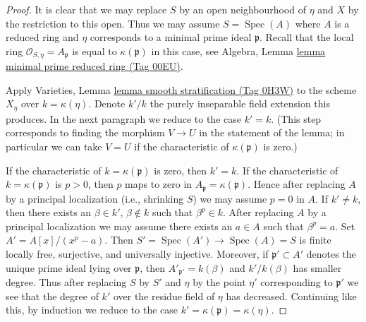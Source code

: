\documentclass{amsart}
\theoremstyle{plain}
\theoremstyle{definition}
\theoremstyle{remark}
\numberwithin{equation}{subsection}
\def\Spec{\mathop{\mathrm{Spec}}}
\begin{document}
\begin{proof}
It is clear that we may replace $S$ by an open neighbourhood of $\eta$
and $X$ by the restriction to this open.
Thus we may assume $S = \Spec(A)$ where $A$ is a reduced ring
and $\eta$ corresponds to a minimal prime ideal $\mathfrak p$.
Recall that the local ring $\mathcal{O}_{S, \eta} = A_\mathfrak p$
is equal to $\kappa(\mathfrak p)$ in this case, see
Algebra, Lemma \href{https://stacks.math.columbia.edu/tag/00EU}{lemma minimal prime reduced ring (Tag 00EU)}.

\medskip\noindent
Apply Varieties, Lemma \href{https://stacks.math.columbia.edu/tag/0H3W}{lemma smooth stratification (Tag 0H3W)}
to the scheme $X_\eta$ over $k = \kappa(\eta)$.
Denote $k'/k$ the purely inseparable field extension this produces.
In the next paragraph we reduce to the case $k' = k$.
(This step corresponds to finding the morphism $V \to U$ in
the statement of the lemma; in particular we can take $V = U$
if the characteristic of $\kappa(\mathfrak p)$ is zero.)

\medskip\noindent
If the characteristic of $k = \kappa(\mathfrak p)$ is zero, then
$k' = k$. If the characteristic of $k = \kappa(\mathfrak p)$
is $p > 0$, then $p$ maps to zero in $A_\mathfrak p = \kappa(\mathfrak p)$.
Hence after replacing $A$ by a principal localization (i.e.,
shrinking $S$) we may assume $p = 0$ in $A$. If $k' \not = k$, then
there exists an $\beta \in k'$, $\beta \not \in k$
such that $\beta^p \in k$. After replacing $A$ by a principal
localization we may assume there exists an $a \in A$ such
that $\beta^p = a$. Set $A' = A[x]/(x^p - a)$.
Then $S' = \Spec(A') \to \Spec(A) = S$ is finite locally free,
surjective, and universally injective. Moreover, if $\mathfrak p' \subset A'$
denotes the unique prime ideal lying over $\mathfrak p$,
then $A'_{\mathfrak p'} = k(\beta)$ and $k'/k(\beta)$
has smaller degree. Thus after replacing $S$ by $S'$
and $\eta$ by the point $\eta'$ corresponding to $\mathfrak p'$
we see that the degree of $k'$ over the residue field of $\eta$
has decreased. Continuing like this, by induction we reduce
to the case $k' = \kappa(\mathfrak p) = \kappa(\eta)$.


\end{proof}
\end{document}
